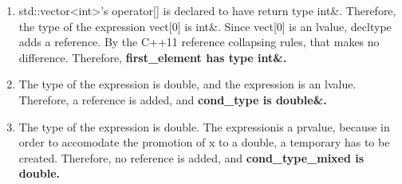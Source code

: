 \documentclass[a4paper,11pt,twoside]{book}
\begin{document}
\begin{itemize}
\begin{enumerate}
		\item std::vector<int>'s operator[] is declared to have return type int\&. Therefore, the type of the expression vect[0] is int\&. Since vect[0] is an lvalue, decltype adds a reference. By the C++11 reference collapsing rules, that makes no difference. Therefore, \textbf{first\_element has type int\&.}  
		
		\item  The type of the expression is double, and the expression is an lvalue. Therefore, a reference is added, and \textbf{cond\_type is double\&.}
		
		\item The type of the expression is double. The expressionis a prvalue, because in order to accomodate the promotion of x to a double, a temporary has to be created. Therefore, no reference is added, and \textbf{cond\_type\_mixed is double.}
	\end{enumerate}

\end{itemize}
\end{document}
